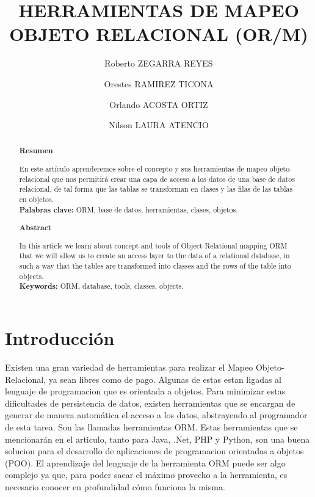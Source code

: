 \documentclass[%
 reprint,
 amsmath,amssymb,
 aps,
]{revtex4-1}
\begin{document}
\title{HERRAMIENTAS DE MAPEO OBJETO RELACIONAL (OR/M)}
\author{Roberto ZEGARRA REYES}
\author{Orestes RAMIREZ TICONA}
\author{Orlando ACOSTA ORTIZ}
\author{Nilson LAURA ATENCIO}
%

\begin{abstract}
\begin{center}
\textbf{Resumen}
\end{center}
En este artículo aprenderemos sobre el concepto y sus herramientas de mapeo objeto-relacional que nos permitirá crear una capa de acceso a los datos de una base de datos relacional, de tal forma que las tablas se transforman en clases y las filas de las tablas en objetos.\\
\textbf{Palabras clave:}   ORM, base de datos, herramientas, clases, objetos.\\

\begin{center}
\textbf{Abstract}
\end{center}
In this article we learn about concept and tools of Object-Relational mapping ORM that we will allow us to create an access layer to the data of a relational database, in such a way that the tables are transformed into classes and the rows of the table into objects.\\
\textbf{Keywords:}   ORM, database, tools, classes, objects.

\end{abstract}



\maketitle


\section {Introducción}\label{sec:1}
Existen una gran variedad de herramientas para realizar el Mapeo Objeto-Relacional, ya sean libres como de pago. Algunas de estas estan ligadas al lenguaje de programacion que es orientada a objetos. Para minimizar estas dificultades de persistencia de datos, existen herramientas que se encargan de generar de manera automática el acceso a los datos, abstrayendo al programador de esta tarea. Son las llamadas herramientas ORM.
Estas herramientas que se mencionarán en el articulo, tanto para Java, .Net, PHP y Python, son una buena solucion para el desarrollo de aplicaciones de programacion orientadas a objetos (POO). 
El aprendizaje del lenguaje de la herramienta ORM puede ser algo complejo ya que, para poder sacar el máximo provecho a la herramienta, es necesario conocer en profundidad cómo funciona la misma.
\end{document}
